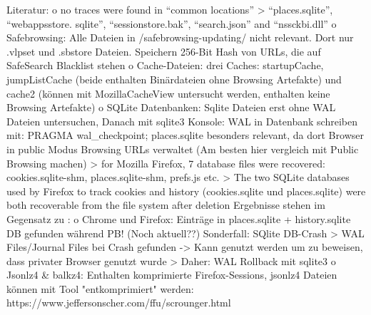 Literatur:
	o no traces were found in “common locations” \cite{Montasari.2015}
		>  “places.sqlite”, “webappsstore. sqlite”, “sessionstore.bak”, “search.json” and “nssckbi.dll”
	o	Safebrowsing: Alle Dateien in /safebrowsing-updating/ nicht relevant. Dort nur .vlpset und .sbstore Dateien. Speichern 256-Bit Hash von URLs, die auf SafeSearch Blacklist stehen 
	o	Cache-Dateien: drei Caches: startupCache, jumpListCache (beide enthalten Binärdateien ohne Browsing Artefakte) und cache2 (können mit MozillaCacheView untersucht werden, enthalten keine Browsing Artefakte)
	o	SQLite Datenbanken: Sqlite Dateien erst ohne WAL Dateien untersuchen, Danach mit sqlite3 Konsole: WAL in Datenbank schreiben mit: PRAGMA wal\_checkpoint; places.sqlite besonders relevant, da dort Browser in public Modus Browsing URLs verwaltet (Am besten hier vergleich mit Public Browsing machen)	
		> \cite{Fayyad.2021} for Mozilla Firefox, 7 database files were recovered: cookies.sqlite-shm, places.sqlite-shm, prefs.js etc.
		> \cite{Muir.2019} The two SQLite databases used by Firefox to track cookies and history (cookies.sqlite und places.sqlite) were both recoverable from the file system after deletion	
		Ergebnisse stehen im Gegensatz zu \cite{Hedberg.2013} :
			o	Chrome und Firefox: Einträge in places.sqlite + history.sqlite DB gefunden während PB! (Noch aktuell??)
		Sonderfall: SQlite DB-Crash \cite{Hedberg.2013}
			> WAL Files/Journal Files bei Crash gefunden -> Kann genutzt werden um zu beweisen, dass privater Browser genutzt wurde
			> Daher: WAL Rollback mit sqlite3	
	o	Jsonlz4 \& balkz4: Enthalten komprimierte Firefox-Sessions, jsonlz4 Dateien können mit Tool "entkomprimiert" werden: https://www.jeffersonscher.com/ffu/scrounger.html


